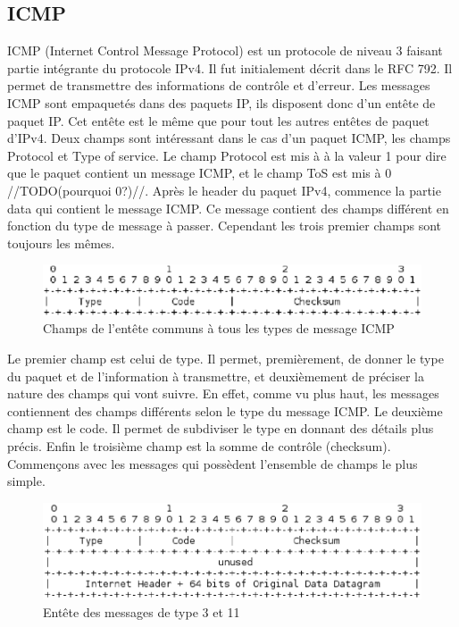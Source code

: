 
\subsection{ICMP} ICMP (Internet Control Message Protocol) est un protocole de
niveau 3 faisant partie intégrante du protocole IPv4. Il fut initialement
décrit dans le RFC 792\cite{url-RFC-ICMP}.
Il permet de transmettre des informations de contrôle et d'erreur. Les messages
ICMP sont empaquetés dans des paquets IP, ils disposent donc d'un entête de
paquet IP. Cet entête est le même que pour tout les autres entêtes de paquet
d'IPv4. Deux champs sont intéressant dans le cas d'un paquet ICMP, les champs
Protocol et Type of service. Le champ Protocol est mis à à la valeur 1 pour
dire que le paquet contient un message ICMP, et le champ ToS est mis à 0
//TODO(pourquoi 0?)//.  Après le header du paquet IPv4, commence la partie data
qui contient le message ICMP. Ce message contient des champs différent en
fonction du type de message à passer. Cependant les trois premier champs sont
toujours les mêmes.


\begin{figure}[h]
\centering
\includegraphics[width=15cm]{./pics/header.eps}
\caption{Champs de l'entête communs à tous les types de message ICMP}
\label{fig:headicmp}
\end{figure}

Le premier champ est celui de type. Il permet, premièrement, de donner le type
du paquet et de l'information à transmettre, et deuxièmement de préciser la
nature des champs qui vont suivre. En effet, comme vu plus haut, les messages
contiennent des champs différents selon le type du message ICMP.  Le deuxième
champ est le code. Il permet de subdiviser le type en donnant des détails plus
précis. Enfin le troisième champ est la somme de contrôle (checksum).
Commençons avec les messages qui possèdent l'ensemble de champs le plus simple.

\begin{figure}[h]
\centering
\includegraphics[width=15cm]{./pics/header1.eps}
\caption{Entête des messages de type 3 et 11}
\label{fig:head1icmp}
\end{figure}

